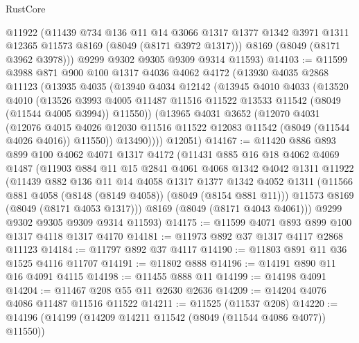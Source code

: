 \begin{lexlean}{RustCore}
\begin{coremodule}
        @11922
        (@11439
          @734
          @136
          @11
          @14
          @3066
          @1317
          @1377
          @1342
          @3971
          @1311
          @12365
          @11573
          @8169
          (@8049 (@8171 @3972 @1317)))
        @8169
        (@8049 (@8171 @3962 @3978)))
      @9299
      @9302
      @9305
      @9309
      @9314
      @11593)
@14103 := @11599
    @3988
    @871
    @900
    @100
    @1317
    @4036
    @4062
    @4172
    (@13930
      @4035
      @2868
      @11123
      (@13935
        @4035
        (@13940
          @4034
          @12142
          (@13945
            @4010
            @4033
            (@13520
              @4010
              (@13526
                @3993
                @4005
                @11487
                @11516
                @11522
                @13533
                @11542
                (@8049 (@11544 @4005 @3994))
                @11550))
            (@13965
              @4031
              @3652
              (@12070
                @4031
                (@12076
                  @4015
                  @4026
                  @12030
                  @11516
                  @11522
                  @12083
                  @11542
                  (@8049 (@11544 @4026 @4016))
                  @11550))
              @13490))))
      @12051)
@14167 := @11420
    @886
    @893
    @899
    @100
    @4062
    @4071
    @1317
    @4172
    (@11431
      @885
      @16
      @18
      @4062
      @4069
      @1487
      (@11903
        @884
        @11
        @15
        @2841
        @4061
        @4068
        @1342
        @4042
        @1311
        @11922
        (@11439
          @882
          @136
          @11
          @14
          @4058
          @1317
          @1377
          @1342
          @4052
          @1311
          (@11566 @881 @4058 (@8148 (@8149 @4058)) (@8049 (@8154 @881 @11)))
          @11573
          @8169
          (@8049 (@8171 @4053 @1317)))
        @8169
        (@8049 (@8171 @4043 @4061)))
      @9299
      @9302
      @9305
      @9309
      @9314
      @11593)
@14175 := @11599 @4071 @893 @899 @100 @1317 @4118 @1317 @4170
@14181 := @11973 @892 @37 @1317 @4117 @2868 @11123
@14184 := @11797 @892 @37 @4117
@14190 := @11803 @891 @11 @36 @1525 @4116 @11707
@14191 := @11802 @888
@14196 := @14191 @890 @11 @16 @4091 @4115
@14198 := @11455 @888 @11
@14199 := @14198 @4091
@14204 := @11467 @208 @55 @11 @2630 @2636
@14209 := @14204 @4076 @4086 @11487 @11516 @11522
@14211 := @11525 (@11537 @208)
@14220 := @14196 (@14199 (@14209 @14211 @11542 (@8049 (@11544 @4086 @4077)) @11550))

\end{coremodule}
\end{lexlean}
